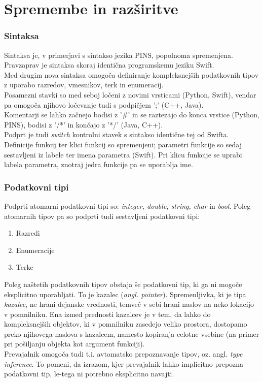 \documentclass[a4paper, 12pt]{book}
\begin{document}
\section{Spremembe in razširitve}

\subsubsection{Sintaksa}

Sintaksa je, v primerjavi s sintakso jezika PINS, popolnoma spremenjena. Pravzaprav je sintaksa skoraj identična programskemu jeziku Swift. \\
\indent Med drugim nova sintaksa omogoča definiranje kompleksnejših podatkovnih tipov z uporabo razredov, vmesnikov, terk in enumeracij. \\
\indent Posamezni stavki so med seboj ločeni z novimi vrsticami (Python, Swift), vendar pa omogoča njihovo ločevanje tudi s podpičjem ';' (C++, Java). \\
\indent Komentarji se lahko začnejo bodisi z '\#' in se raztezajo do konca vrstice (Python, PINS), bodisi z '/*' in končajo z '*/' (Java, C++). \\
\indent Podprt je tudi \textit{switch} kontrolni stavek s sintakso identične tej od Swifta.\\
\indent Definicije funkcij ter klici funkcij so spremenjeni; parametri funkcije so sedaj sestavljeni iz labele ter imena parametra (Swift). Pri klicu funkcije se uprabi labela parametra, znotraj jedra funkcije pa se uporablja ime.

\subsubsection{Podatkovni tipi}

Podprti atomarni podatkovni tipi so: \textit{integer, double, string, char} in \textit{bool}. Poleg atomarnih tipov pa so podprti tudi sestavljeni podatkovni tipi:

\begin{enumerate}
	\item Razredi
	\item Enumeracije
	\item Terke
\end{enumerate}

Poleg naštetih podatkovnih tipov obstaja še podatkovni tip, ki ga ni mogoče eksplicitno uporabljati. To je kazalec (\textit{angl. pointer}). Spremenljivka, ki je tipa \textit{kazalec}, ne hrani dejanske vrednosti, temveč v sebi hrani naslov na neko lokacijo v pomnilniku. Ena izmed prednosti kazalcev je v tem, da lahko do kompleksnejših objektov, ki v pomnilniku zasedejo veliko prostora, dostopamo preko njihovega naslova s kazalcem, namesto kopiranja celotne vsebine (na primer pri pošiljanju objekta kot argument funkciji). \\
\indent Prevajalnik omogoča tudi t.i. avtomatsko prepoznavanje tipov, oz. angl. \textit{type inference}. To pomeni, da izrazom, kjer prevajalnik lahko implicitno prepozna podatkovni tip, le-tega ni potrebno eksplicitno navajti.
\end{document}
